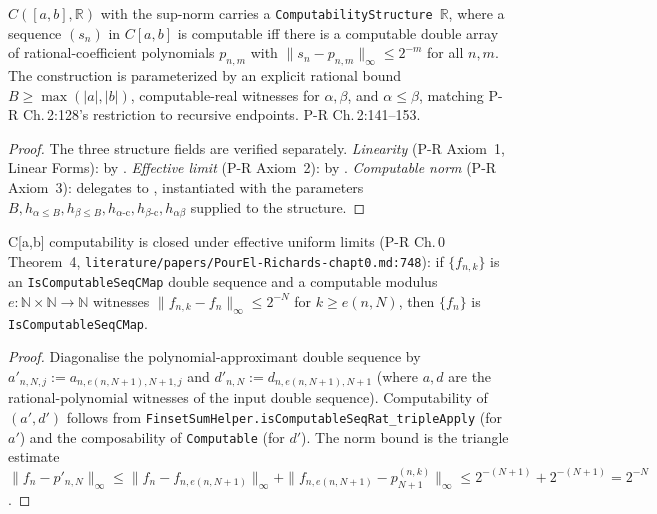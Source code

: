 \begin{theorem}
  \label{thm:l4_cmap_instance}
  \leanok
  $C([a,b], \mathbb{R})$ with the sup-norm carries a \texttt{ComputabilityStructure}~$\mathbb{R}$, where a sequence $(s_n)$ in $C[a,b]$ is computable iff there is a computable double array of rational-coefficient polynomials $p_{n,m}$ with $\|s_n - p_{n,m}\|_\infty \le 2^{-m}$ for all $n,m$. The construction is parameterized by an explicit rational bound $B \ge \max(|a|,|b|)$, computable-real witnesses for $\alpha, \beta$, and $\alpha \le \beta$, matching P-R Ch.\,2:128's restriction to recursive endpoints. P-R Ch.\,2:141--153.
\end{theorem}
\begin{proof}\leanok
  The three structure fields are verified separately.
  \emph{Linearity} (P-R Axiom~1, Linear Forms): by .
  \emph{Effective limit} (P-R Axiom~2): by .
  \emph{Computable norm} (P-R Axiom~3): delegates to , instantiated with the parameters $B, h_{\alpha\le B}, h_{\beta\le B}, h_{\alpha\text{-c}}, h_{\beta\text{-c}}, h_{\alpha\beta}$ supplied to the structure.
\end{proof}

\begin{lemma}
  \label{lem:l4_cmap_axiom2}
  \leanok
  C[a,b] computability is closed under effective uniform limits (P-R Ch.\,0 Theorem~4, \texttt{literature/papers/PourEl-Richards-chapt0.md:748}): if $\{f_{n,k}\}$ is an \texttt{IsComputableSeqCMap} double sequence and a computable modulus $e : \mathbb{N} \times \mathbb{N} \to \mathbb{N}$ witnesses $\|f_{n,k} - f_n\|_\infty \le 2^{-N}$ for $k \ge e(n,N)$, then $\{f_n\}$ is \texttt{IsComputableSeqCMap}.
\end{lemma}
\begin{proof}
  \leanok
  Diagonalise the polynomial-approximant double sequence by $a'_{n,N,j} := a_{n, e(n,N+1), N+1, j}$ and $d'_{n,N} := d_{n, e(n,N+1), N+1}$ (where $a, d$ are the rational-polynomial witnesses of the input double sequence). Computability of $(a', d')$ follows from \texttt{FinsetSumHelper.isComputableSeqRat\_tripleApply} (for $a'$) and the composability of \texttt{Computable} (for $d'$). The norm bound is the triangle estimate $\|f_n - p'_{n,N}\|_\infty \le \|f_n - f_{n,e(n,N+1)}\|_\infty + \|f_{n,e(n,N+1)} - p^{(n,k)}_{N+1}\|_\infty \le 2^{-(N+1)} + 2^{-(N+1)} = 2^{-N}$.
\end{proof}


